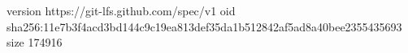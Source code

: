 version https://git-lfs.github.com/spec/v1
oid sha256:11e7b3f4acd3bd144c9c19ea813def35da1b512842af5ad8a40bee2355435693
size 174916

